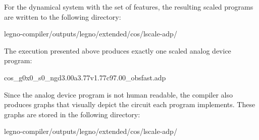 For the  dynamical system with the  set of features, the
resulting scaled programs are written to the following directory:

\begin{snippet}
  legno-compiler/outputs/legno/extended/cos/lscale-adp/
\end{snippet}

The \lscale execution presented above produces exactly one scaled analog device program: 

\begin{snippet}
  cos_g0x0_s0_ngd3.00a3.77v1.77c97.00_obsfast.adp
\end{snippet}

Since the analog device program is not human readable, the compiler
also produces graphs that visually depict the circuit each program implements.
These graphs are stored in the following directory:

\begin{snippet}
  legno-compiler/outputs/legno/extended/cos/lscale-adp/
\end{snippet}